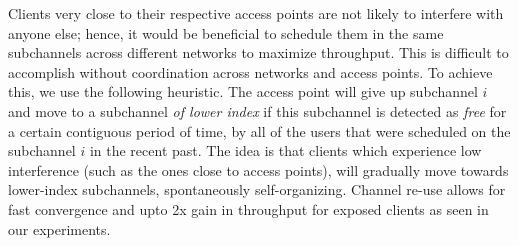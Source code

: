  Clients very close to their respective access points are not likely to interfere with anyone else;  
hence, it would be beneficial to schedule them in the same subchannels across different networks to maximize throughput. 
This is difficult to accomplish without coordination across networks and access points.
To achieve this, we use the following heuristic.
The access point will give up subchannel $i$ and move to a subchannel \emph{of lower index} if this subchannel is detected as \emph{free} for a certain contiguous period of time, by all of the users that were scheduled on the subchannel $i$ in the recent past. 
The idea is that clients which experience low interference (such as the ones close to access points), 
will gradually move towards lower-index subchannels, spontaneously self-organizing. 
Channel re-use allows for fast convergence and upto 2x gain in throughput for exposed clients as seen in our experiments. 




